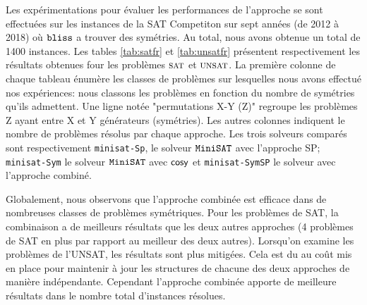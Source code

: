 \begin{table}[!htbp]\footnotesize
	\centering
	\caption{Comparaison des approches sur les instances UNSAT.}
	\label{tab:unsatfr}
\end{table}

Les expérimentations pour évaluer les performances de l'approche se sont effectuées sur les instances de la SAT Competiton sur sept années 
(de 2012 à 2018) où $\texttt{bliss}$ a trouver des symétries. Au total, nous avons obtenue un total de 1400 instances. 
Les tables \ref{tab:satfr} et \ref{tab:unsatfr} présentent respectivement
les résultats obtenues four les problèmes $\textsc{sat}$ et $\textsc{unsat}$.
La première colonne de chaque tableau énumère les classes de problèmes sur lesquelles nous avons effectué nos expériences: nous classons les problèmes en fonction du nombre de symétries qu'ils admettent. Une ligne notée "permutations X-Y (Z)" regroupe les problèmes Z ayant entre X et Y générateurs (symétries). Les autres colonnes indiquent le nombre de problèmes résolus par chaque approche. Les trois solveurs comparés sont respectivement
\texttt{minisat-Sp}, le solveur $\texttt{MiniSAT}$ avec l'approche SP; \texttt{minisat-Sym} le solveur $\texttt{MiniSAT}$ avec $\textsf{cosy}$ et \texttt{minisat-SymSP} le solveur avec l'approche combiné.

Globalement, nous observons que l'approche combinée est efficace dans de nombreuses classes de problèmes symétriques. Pour les problèmes de SAT, la combinaison a de meilleurs résultats que les deux autres approches (4 problèmes de SAT en plus par rapport au meilleur des deux autres). Lorsqu'on examine les problèmes de l'UNSAT, les résultats sont plus mitigées. Cela est du au coût mis en place pour maintenir à jour les structures de chacune des deux approches de manière indépendante.
Cependant l'approche combinée apporte de meilleure résultats dans le nombre total d'instances résolues.

